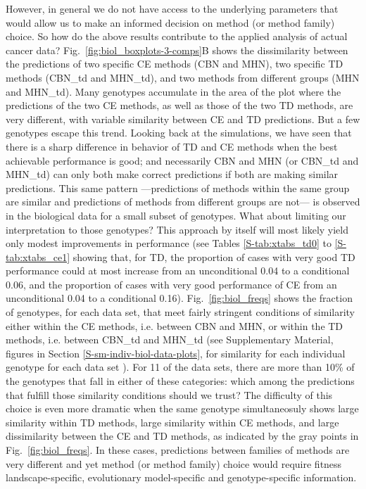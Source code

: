\documentclass[a4paper,10pt]{article}
\begin{document}
However, in general we do not have access to the underlying parameters
  that would allow us to make an informed decision on method (or method family)
  choice. So how do the above results contribute to the applied analysis of actual
  cancer data? Fig.~\ref{fig:biol_boxplots-3-comps}B shows the dissimilarity
between the predictions of two specific CE methods (CBN and MHN), two specific
TD methods (CBN\_td and MHN\_td), and two methods from different groups (MHN and
MHN\_td).
Many genotypes accumulate in the area of the plot where the predictions of the
two CE methods, as well as those of the two TD methods, are very different, with variable
similarity between CE and TD predictions. But a few genotypes escape this trend.
Looking back at the simulations, we have seen that there
is a sharp difference in behavior of TD and CE methods when the best
achievable performance is good; and necessarily CBN and MHN (or CBN\_td
and MHN\_td) can only both make correct predictions if both are making
similar predictions. This same pattern ---predictions
of methods within the same
  group are similar and predictions of methods from different groups are not--- is
  observed in the biological data for a small subset of genotypes.
  What about limiting our interpretation to those genotypes?
This approach by itself will most likely yield only modest improvements
in performance (see Tables
\ref{S-tab:xtabs_td0} to \ref{S-tab:xtabs_ce1} showing that, for TD, the
proportion of cases with very good TD performance could at most increase
from an unconditional 0.04 to a conditional 0.06, and the proportion of
cases with very good performance of CE from an unconditional 0.04 to a
conditional 0.16).
Fig.~\ref{fig:biol_freqs} shows the fraction of genotypes,
for each data set, that meet fairly stringent conditions of similarity
either within the CE methods, i.e. between CBN and MHN, or within the TD
methods, i.e. between CBN\_td and MHN\_td (see Supplementary Material,
figures in Section \ref{S-sm-indiv-biol-data-plots}, for similarity for
each individual genotype for each data
set%
).  For 11 of the
data sets, there are more than 10\% of the genotypes that fall in either
of these categories: which among the predictions that fulfill those
similarity conditions should we trust? The difficulty of this choice is
even more dramatic when the same genotype simultaneosuly shows large similarity
within TD methods, large similarity within CE methods, and large
dissimilarity between the CE and TD methods, as indicated by the gray
points in Fig.~\ref{fig:biol_freqs}. In these cases, predictions between families of
methods are very different and yet method (or method family) choice would
require fitness landscape-specific, evolutionary model-specific and
genotype-specific information. %
\end{document}
